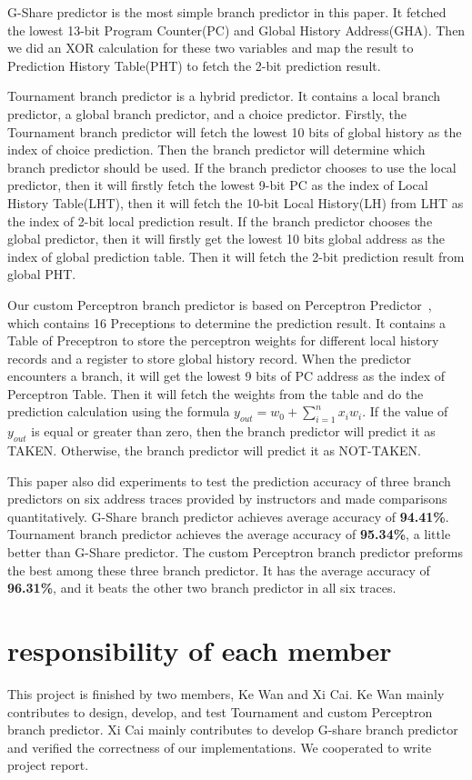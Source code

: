 \documentclass[conference]{IEEEtran}
\begin{document}
G-Share predictor is the most simple branch predictor in this paper. It fetched the lowest 13-bit Program Counter(PC) and Global History Address(GHA). Then we did an XOR calculation for these two variables
and map the result to Prediction History Table(PHT) to fetch the 2-bit prediction result. 

Tournament branch predictor is a hybrid predictor. It contains a local branch
predictor, a global branch predictor, and a choice predictor. Firstly, the Tournament branch predictor will fetch the lowest 10 bits of global history as the index of choice prediction. Then the branch predictor 
will determine which branch predictor should be used. If the branch predictor chooses to use the local predictor, then it will firstly fetch the lowest 9-bit PC as the index of Local History Table(LHT), then it 
will fetch the 10-bit Local History(LH) from LHT as the index of 2-bit local prediction result. If the branch predictor chooses the global predictor, then
it will firstly get the lowest 10 bits global address as the index of global prediction table. Then it will fetch the 2-bit prediction result from global PHT.

Our custom Perceptron branch predictor is based on Perceptron Predictor~\cite{nicepaper4}, which contains 16 Preceptions to determine the prediction result. It contains a Table of Preceptron to store the perceptron weights for different local
history records and a register to store global history record. When the predictor encounters a branch, it will get the lowest 9 bits of PC address as the index of Perceptron Table. Then it will fetch the weights from the table and do
the prediction calculation using the formula $y_{out}=w_0+\sum_{i=1}^{n}{x_iw_i}$. If the value of $y_{out}$ is equal or greater than zero, then the branch predictor will predict it as TAKEN. Otherwise, the branch predictor will predict it as NOT-TAKEN. 

This paper also did experiments to test the prediction accuracy of three branch predictors on six address traces provided by instructors and made comparisons quantitatively. 
G-Share branch predictor achieves average accuracy of \textbf{94.41\%}. Tournament branch predictor achieves the average accuracy of \textbf{95.34\%}, a little better than G-Share predictor. 
The custom Perceptron branch predictor preforms the best among these three branch predictor. It has the average accuracy of \textbf{96.31\%}, and it beats the other two branch predictor in all six traces. 


\section{responsibility of each member}
This project is finished by two members, Ke Wan and Xi Cai. Ke Wan mainly contributes to design, develop, and test Tournament 
and custom Perceptron branch predictor. Xi Cai mainly contributes to develop G-share branch predictor and verified the 
correctness of our implementations. We cooperated to write project report. 
\end{document}

